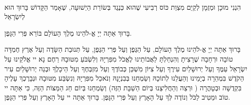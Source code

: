 \ \\

הִנְנִי מוּכָן וּמְזֻמָן לְקַיֵם מִצְוַת כּוֹס רְבִיעִי שֶׁהוּא כְּנֶגֶד בְּשׂוֹרַת הַיְשׁוּעָה, שֶׁאָמַר הַקָּדוֹשׁ בָּרוּךְ הוּא לְיִשְׂרָאֵל 

בָּרוּךְ אַתָּה יְיָ אֱ-לֹהֵינוּ מֶלֶךְ הָעוֹלָם בּוֹרֵא פְּרִי הַגָּפֶן.



בָּרוּךְ אַתָּה יְיָ אֱ-לֹהֵינוּ מֶלֶךְ הָעוֹלָם, עַל הַגֶּפֶן וְעַל פְּרִי הַגֶּפֶן, עַל תְּנוּבַת הַשָּׂדֶה וְעַל אֶרֶץ חֶמְדָּה טוֹבָה וּרְחָבָה שֶׁרָצִיתָ וְהִנְחַלְתָּ לַאֲבוֹתֵינוּ לֶאֱכֹל מִפִּרְיָהּ וְלִשְׂבֹּעַ מִטּוּבָהּ רַחֶם נָא יי אֱלֹקֵינוּ עַל יִשְׂרָאֵל עַמֶּךָ וְעַל יְרוּשָׁלַיִם עִירֶךָ וְעַל צִיּוֹן מִשְׁכַּן כְּבוֹדֶךָ וְעַל מִזְבְּחֶךָ וְעַל הֵיכָלֶךָ וּבְנֵה יְרוּשָׁלַיִם עִיר הַקֹדֶשׁ בִּמְהֵרָה בְיָמֵינוּ וְהַעֲלֵנוּ לְתוֹכָהּ וְשַׂמְחֵנוּ בְּבִנְיָנָהּ וְנֹאכַל מִפִּרְיָהּ וְנִשְׂבַּע מִטּוּבָהּ וּנְבָרֶכְךָ עָלֶיהָ בִּקְדֻשָׁה 
וּבְטָהֳרָה ( וּרְצֵה וְהַחֲלִיצֵנוּ בְּיוֹם הַשַׁבָּת הַזֶּה) וְשַׂמְחֵנוּ בְּיוֹם חַג הַמַּצּוֹת הַזֶּה, כִּי אַתָּה יי טוֹב וּמֵטִיב לַכֹּל וְנוֹדֶה לְּךָ עַל הָאָרֶץ וְעַל פְּרִי הַגָּפֶן. בָּרוּךְ אַתָּה יי עַל הָאָרֶץ וְעַל פְּרִי הַגָּפֶן.

\break


